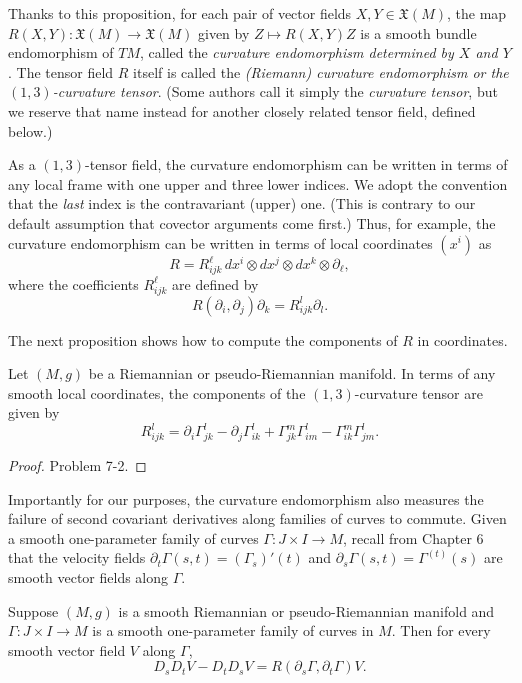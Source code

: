 Thanks to this proposition, for each pair of vector fields $X, Y \in \mathfrak{X}(M)$, the map $R(X,Y): \mathfrak{X}(M) \to \mathfrak{X}(M)$ given by $Z \mapsto R(X,Y)Z$ is a smooth bundle endomorphism of $TM$, called the \emph{curvature endomorphism determined by $X$ and $Y$}. The tensor field $R$ itself is called the \emph{(Riemann) curvature endomorphism or the $(1, 3)$-curvature tensor}. (Some authors call it simply the \emph{curvature tensor}, but we reserve that name instead for another closely related tensor field, defined below.)

As a $(1,3)$-tensor field, the curvature endomorphism can be written in terms of any local frame with one upper and three lower indices. We adopt the convention that the \emph{last} index is the contravariant (upper) one. (This is contrary to our default assumption that covector arguments come first.) Thus, for example, the curvature endomorphism can be written in terms of local coordinates $(x^i)$ as
$$R = R_{ijk}^\ell \, dx^i \otimes dx^j \otimes dx^k \otimes \partial_\ell,$$
where the coefficients $R_{ijk}^\ell$ are defined by
\[
R(\partial_i, \partial_j) \partial_k = R_{ijk}^l \partial_l.
\]

The next proposition shows how to compute the components of $R$ in coordinates.

\begin{proposition}
\label{prop:curvature-tensor-components}
Let $(M, g)$ be a Riemannian or pseudo-Riemannian manifold. In terms of any smooth local coordinates, the components of the $(1,3)$-curvature tensor are given by
\begin{equation}
R_{ijk}^l = \partial_i \Gamma_{jk}^l - \partial_j \Gamma_{ik}^l + \Gamma_{jk}^m \Gamma_{im}^l - \Gamma_{ik}^m \Gamma_{jm}^l. \tag{7.4}
\end{equation}
\end{proposition}

\begin{proof}
Problem 7-2.
\end{proof}

Importantly for our purposes, the curvature endomorphism also measures the failure of second covariant derivatives along families of curves to commute. Given a smooth one-parameter family of curves $\Gamma: J \times I \to M$, recall from Chapter 6 that the velocity fields $\partial_t \Gamma(s,t) = (\Gamma_s)'(t)$ and $\partial_s \Gamma(s,t) = \Gamma^{(t)}(s)$ are smooth vector fields along $\Gamma$.

\begin{proposition}
\label{prop:curvature-commutator-failure}
Suppose $(M,g)$ is a smooth Riemannian or pseudo-Riemannian manifold and $\Gamma: J \times I \to M$ is a smooth one-parameter family of curves in $M$. Then for every smooth vector field $V$ along $\Gamma$,
\[
D_s D_t V - D_t D_s V = R(\partial_s \Gamma, \partial_t \Gamma) V.
\]
\end{proposition}

